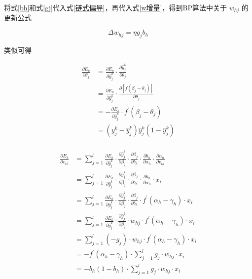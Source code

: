 \documentclass{ctexart}
\begin{document}
	将式\eqref{bh}和式\eqref{gj}代入式\eqref{链式偏导}，再代入式\eqref{w增量}，得到BP算法中关于 $w_{hj}$ 的更新公式
	
	\begin{equation}
		\Delta w_{h j}=\eta g_{j} b_{h}
	\end{equation}

	类似可得
	
	\begin{equation}
		\begin{aligned}
			\frac{\partial E_{k}}{\partial \theta_{j}} &=\frac{\partial E_{k}}{\partial \hat{y}_{j}^{k}} \cdot \frac{\partial \hat{y}_{j}^{k}}{\partial \theta_{j}} \\
			&=\frac{\partial E_{k}}{\partial \hat{y}_{j}^{k}} \cdot \frac{\partial\left[f\left(\beta_{j}-\theta_{j}\right)\right]}{\partial \theta_{j}} \\
			&=-\frac{\partial E_{k}}{\partial \hat{y}_{j}^{k}} \cdot f^{\prime}\left(\beta_{j}-\theta_{j}\right)\\
			&=\left(y_{j}^{k}-\hat{y}_{j}^{k}\right) \hat{y}_{j}^{k}\left(1-\hat{y}_{j}^{k}\right) \\
		\end{aligned}
	\end{equation}

	\begin{equation}
		\begin{aligned}
			\frac{\partial E_{k}}{\partial v_{i h}} &=\sum_{j=1}^{l} \frac{\partial E_{k}}{\partial \hat{y}_{j}^{k}} \cdot \frac{\partial \hat{y}_{j}^{k}}{\partial \beta_{j}} \cdot \frac{\partial \beta_{j}}{\partial b_{h}} \cdot \frac{\partial b_{h}}{\partial \alpha_{h}} \cdot \frac{\partial \alpha_{h}}{\partial v_{i h}} \\
			&=\sum_{j=1}^{l} \frac{\partial E_{k}}{\partial \hat{y}_{j}^{k}} \cdot \frac{\partial \hat{y}_{j}^{k}}{\partial \beta_{j}} \cdot \frac{\partial \beta_{j}}{\partial b_{h}} \cdot \frac{\partial b_{h}}{\partial \alpha_{h}} \cdot x_{i} \\
			&=\sum_{j=1}^{l} \frac{\partial E_{k}}{\partial \hat{y}_{j}^{k}} \cdot \frac{\partial \hat{y}_{j}^{k}}{\partial \beta_{j}} \cdot \frac{\partial \beta_{j}}{\partial b_{h}} \cdot f^{\prime}\left(\alpha_{h}-\gamma_{h}\right) \cdot x_{i} \\
			&=\sum_{j=1}^{l} \frac{\partial E_{k}}{\partial \hat{y}_{j}^{k}} \cdot \frac{\partial \hat{y}_{j}^{k}}{\partial \beta_{j}} \cdot w_{h j} \cdot f^{\prime}\left(\alpha_{h}-\gamma_{h}\right) \cdot x_{i} \\
			&=\sum_{j=1}^{l}\left(-g_{j}\right) \cdot w_{h j} \cdot f^{\prime}\left(\alpha_{h}-\gamma_{h}\right) \cdot x_{i} \\
			&=-f^{\prime}\left(\alpha_{h}-\gamma_{h}\right) \cdot \sum_{j=1}^{l} g_{j} \cdot w_{h j} \cdot x_{i} \\
			&=-b_{h}\left(1-b_{h}\right) \cdot \sum_{j=1}^{l} g_{j} \cdot w_{h j} \cdot x_{i} \\
		\end{aligned}
	\end{equation}
\end{document}
